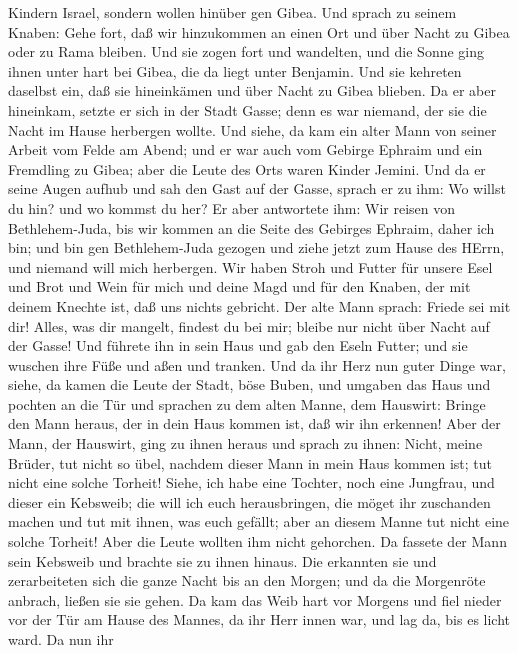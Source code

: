 Kindern Israel, sondern wollen hinüber gen Gibea.  Und
sprach zu seinem Knaben: Gehe fort, daß wir hinzukommen an einen Ort und
über Nacht zu Gibea oder zu Rama bleiben.  Und sie zogen
fort und wandelten, und die Sonne ging ihnen unter hart bei Gibea, die
da liegt unter Benjamin.  Und sie kehreten daselbst ein,
daß sie hineinkämen und über Nacht zu Gibea blieben. Da er aber
hineinkam, setzte er sich in der Stadt Gasse; denn es war niemand, der
sie die Nacht im Hause herbergen wollte.  Und siehe, da kam
ein alter Mann von seiner Arbeit vom Felde am Abend; und er war auch vom
Gebirge Ephraim und ein Fremdling zu Gibea; aber die Leute des Orts
waren Kinder Jemini.  Und da er seine Augen aufhub und sah
den Gast auf der Gasse, sprach er zu ihm: Wo willst du hin? und wo
kommst du her?  Er aber antwortete ihm: Wir reisen von
Bethlehem-Juda, bis wir kommen an die Seite des Gebirges Ephraim, daher
ich bin; und bin gen Bethlehem-Juda gezogen und ziehe jetzt zum Hause
des HErrn, und niemand will mich herbergen.  Wir haben
Stroh und Futter für unsere Esel und Brot und Wein für mich und deine
Magd und für den Knaben, der mit deinem Knechte ist, daß uns nichts
gebricht.  Der alte Mann sprach: Friede sei mit dir! Alles,
was dir mangelt, findest du bei mir; bleibe nur nicht über Nacht auf der
Gasse!  Und führete ihn in sein Haus und gab den Eseln
Futter; und sie wuschen ihre Füße und aßen und tranken. 
Und da ihr Herz nun guter Dinge war, siehe, da kamen die Leute der
Stadt, böse Buben, und umgaben das Haus und pochten an die Tür und
sprachen zu dem alten Manne, dem Hauswirt: Bringe den Mann heraus, der
in dein Haus kommen ist, daß wir ihn erkennen!  Aber der
Mann, der Hauswirt, ging zu ihnen heraus und sprach zu ihnen: Nicht,
meine Brüder, tut nicht so übel, nachdem dieser Mann in mein Haus kommen
ist; tut nicht eine solche Torheit!  Siehe, ich habe eine
Tochter, noch eine Jungfrau, und dieser ein Kebsweib; die will ich euch
herausbringen, die möget ihr zuschanden machen und tut mit ihnen, was
euch gefällt; aber an diesem Manne tut nicht eine solche Torheit!
 Aber die Leute wollten ihm nicht gehorchen. Da fassete der
Mann sein Kebsweib und brachte sie zu ihnen hinaus. Die erkannten sie
und zerarbeiteten sich die ganze Nacht bis an den Morgen; und da die
Morgenröte anbrach, ließen sie sie gehen.  Da kam das Weib
hart vor Morgens und fiel nieder vor der Tür am Hause des Mannes, da ihr
Herr innen war, und lag da, bis es licht ward.  Da nun ihr

